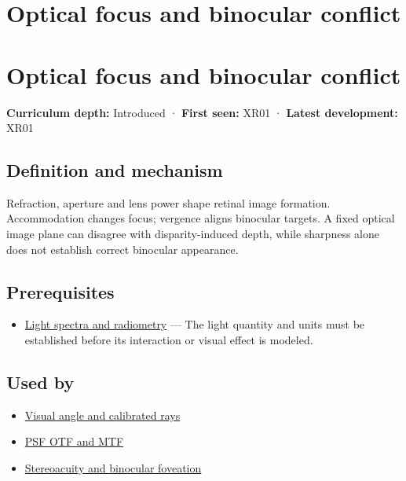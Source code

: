 \hypertarget{appendix-f90cee1be7a4}{}
\section*{Optical focus and binocular conflict}
\section{Optical focus and binocular conflict}\label{appendix-f90cee1be7a4-optical-focus-and-binocular-conflict}

\textbf{Curriculum depth:} Introduced · \textbf{First seen:} XR01 · \textbf{Latest development:} XR01

\subsection{Definition and mechanism}\label{appendix-f90cee1be7a4-definition-and-mechanism}

Refraction, aperture and lens power shape retinal image formation. Accommodation changes focus; vergence aligns binocular targets. A fixed optical image plane can disagree with disparity-induced depth, while sharpness alone does not establish correct binocular appearance.

\subsection{Prerequisites}\label{appendix-f90cee1be7a4-prerequisites}

\begin{itemize}
\tightlist
\item
  \hyperref[appendix-215c2570199b]{Light spectra and radiometry} --- The light quantity and units must be established before its interaction or visual effect is modeled.
\end{itemize}

\subsection{Used by}\label{appendix-f90cee1be7a4-used-by}

\begin{itemize}
\tightlist
\item
  \hyperref[appendix-7d356c396d1a]{Visual angle and calibrated rays}
\item
  \hyperref[appendix-8b76b0efd27f]{PSF OTF and MTF}
\item
  \hyperref[appendix-8dc848f14052]{Stereoacuity and binocular foveation}
\end{itemize}

